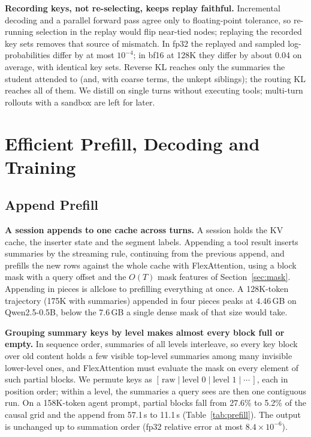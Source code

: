 \documentclass[10pt,twocolumn]{article}
\newcommand{\para}[1]{\noindent\textbf{#1}\hspace{0.5em}}
\begin{document}
\para{Recording keys, not re-selecting, keeps replay faithful.}
Incremental decoding and a parallel forward pass agree only to floating-point tolerance, so
re-running selection in the replay would flip near-tied nodes; replaying the recorded key sets
removes that source of mismatch. In fp32 the replayed and sampled log-probabilities differ by
at most $10^{-4}$; in bf16 at 128K they differ by about 0.04 on average, with identical key
sets. Reverse KL reaches only the summaries the student attended to (and, with coarse terms,
the unkept siblings); the routing KL reaches all of them. We distill on single turns without
executing tools; multi-turn rollouts with a sandbox are left for later.

\section{Efficient Prefill, Decoding and Training}
\label{sec:systems}

\subsection{Append Prefill}
\label{sec:prefill}

\para{A session appends to one cache across turns.}
A session holds the KV cache, the inserter state and the segment labels. Appending a tool
result inserts summaries by the streaming rule, continuing from the previous append, and
prefills the new rows against the whole cache with FlexAttention, using a block mask with a
query offset and the $O(T)$ mask features of Section~\ref{sec:mask}. Appending in pieces is
allclose to prefilling everything at once. A 128K-token trajectory (175K with summaries)
appended in four pieces peaks at 4.46\,GB on Qwen2.5-0.5B, below the 7.6\,GB a single dense
mask of that size would take.

\para{Grouping summary keys by level makes almost every block full or empty.}
In sequence order, summaries of all levels interleave, so every key block over old content
holds a few visible top-level summaries among many invisible lower-level ones, and FlexAttention
must evaluate the mask on every element of such partial blocks. We permute keys as
$[\,\text{raw}\mid\text{level }0\mid\text{level }1\mid\cdots\,]$, each in position order; within a
level, the summaries a query sees are then one contiguous run. On a 158K-token agent prompt,
partial blocks fall from 27.6\% to 5.2\% of the causal grid and the append from 57.1\,s to
11.1\,s (Table~\ref{tab:prefill}). The output is unchanged up to summation order (fp32 relative
error at most $8.4\times10^{-6}$).
\end{document}
